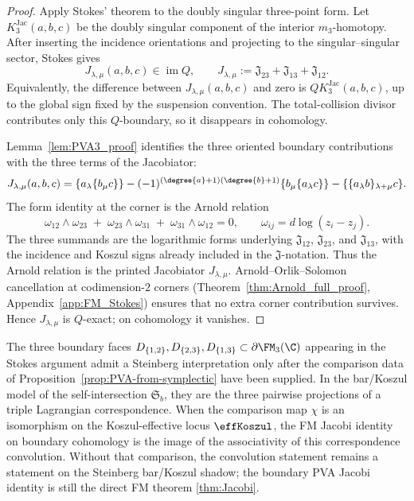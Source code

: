 \begin{proof}
Apply Stokes' theorem to the doubly singular three-point form.  Let
\(K_3^{\mathrm{Jac}}(a,b,c)\) be the doubly singular component of the
interior \(m_3\)-homotopy.  After inserting the incidence orientations
and projecting to the singular--singular sector, Stokes gives
\[
J_{\lambda,\mu}(a,b,c)\in\operatorname{im}Q,
\qquad
J_{\lambda,\mu}:=\mathfrak J_{23}+\mathfrak J_{13}+\mathfrak J_{12}.
\]
Equivalently, the difference between \(J_{\lambda,\mu}(a,b,c)\) and
zero is \(QK_3^{\mathrm{Jac}}(a,b,c)\), up to the global sign fixed by
the suspension convention. The total-collision divisor contributes
only this \(Q\)-boundary, so it disappears in cohomology.

Lemma~\ref{lem:PVA3_proof} identifies the three oriented boundary
contributions with the three terms of the Jacobiator:
\[
J_{\lambda,\mu}(a,b,c)
=
\{a_\lambda\{b_\mu c\}\}
-
(-1)^{(\degree{a}+1)(\degree{b}+1)}
\{b_\mu\{a_\lambda c\}\}
-
\{\{a_\lambda b\}_{\lambda+\mu}c\}.
\]
The form identity at the corner is the Arnold relation
\[
\omega_{12}\wedge\omega_{23}
\;+\;
\omega_{23}\wedge\omega_{31}
\;+\;
\omega_{31}\wedge\omega_{12}=0,
\qquad
\omega_{ij}=d\log(z_i-z_j).
\]
The three summands are the logarithmic forms underlying
\(\mathfrak J_{12}\), \(\mathfrak J_{23}\), and
\(\mathfrak J_{13}\), with the incidence and Koszul signs already
included in the \(\mathfrak J\)-notation. Thus the Arnold relation is
the printed Jacobiator \(J_{\lambda,\mu}\).
Arnold--Orlik--Solomon cancellation at codimension-$2$ corners
(Theorem~\ref{thm:Arnold_full_proof}, Appendix~\ref{app:FM_Stokes})
ensures that no extra corner contribution survives.
Hence \(J_{\lambda,\mu}\) is \(Q\)-exact; on cohomology it vanishes.
\end{proof}

\begin{remark}
\label{rem:jacobi-lagrangian}
The three boundary faces $D_{\{1,2\}},D_{\{2,3\}},D_{\{1,3\}}\subset
\partial\FM_3(\C)$ appearing in the Stokes argument admit a Steinberg
interpretation only after the comparison data of
Proposition~\ref{prop:PVA-from-symplectic} have been supplied.  In the
bar/Koszul model of the self-intersection \(\mathfrak S_b\), they are
the three pairwise projections of a triple Lagrangian correspondence.
When the comparison map \(\chi\) is an isomorphism on the
Koszul-effective locus \(\effKoszul\), the FM Jacobi identity on
boundary cohomology is the image of the associativity of this
correspondence convolution.  Without that comparison, the convolution
statement remains a statement on the Steinberg bar/Koszul shadow; the
boundary PVA Jacobi identity is still the direct FM theorem
\ref{thm:Jacobi}.
\end{remark}

